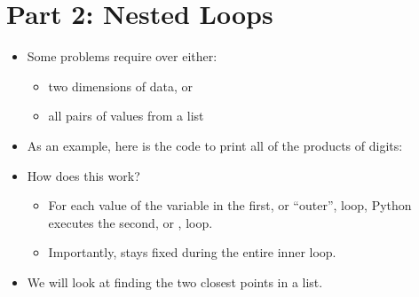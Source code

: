 \documentclass[letterpaper,10pt,english]{sphinxmanual}
\begin{document}
\section{Part 2: Nested Loops}
\label{\detokenize{lecture_notes/lec12_loops2_for_double:part-2-nested-loops}}\begin{itemize}
\item {} 
Some problems require  over either:
\begin{itemize}
\item {} 
two dimensions of data, or

\item {} 
all pairs of values from a list

\end{itemize}

\item {} 
As an example, here is the code to print all of the products of digits:

\begin{sphinxVerbatim}[commandchars=\\\{\}]
  
   
       
            
\end{sphinxVerbatim}

\item {} 
How does this work?
\begin{itemize}
\item {} 
For each value of  the variable in the first, or “outer”,
loop, Python executes the  second, or , loop.

\item {} 
Importantly,  stays fixed during the entire inner loop.

\end{itemize}

\item {} 
We will look at finding the two closest points in a list.

\end{itemize}
\end{document}
